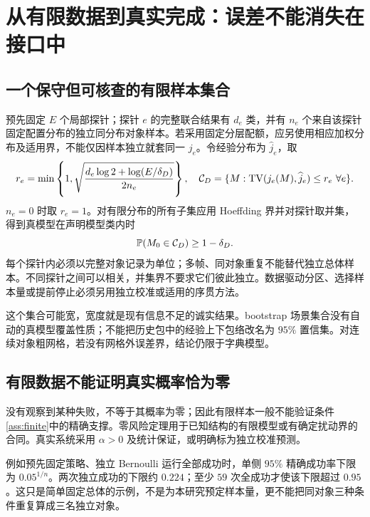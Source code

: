 \documentclass[11pt,a4paper,fontset=fandol]{ctexart}
\theoremstyle{definition}
\theoremstyle{remark}\newtheorem{remark}[theorem]{说明}
\numberwithin{equation}{section}
\newcommand{\TV}{\operatorname{TV}}\newcommand{\supp}{\operatorname{supp}}
\begin{document}
\section{从有限数据到真实完成：误差不能消失在接口中}
\label{sec:errors}
\subsection{一个保守但可核查的有限样本集合}
预先固定 $E$ 个局部探针；探针 $e$ 的完整联合结果有 $d_e$ 类，并有 $n_e$ 个来自该探针固定配置分布的独立同分布对象样本。若采用固定分层配额，应另使用相应加权分布及适用界，不能仅因样本独立就套同一 $j_e$。令经验分布为 $\widehat j_e$，取
\begin{equation}
 r_e=\min\left\{1,\sqrt{\frac{d_e\log2+\log(E/\delta_D)}{2n_e}}\right\},
 \quad
 \cC_D=\{M:\TV(j_e(M),\widehat j_e)\le r_e\ \forall e\}.
 \label{eq:conf}
\end{equation}
$n_e=0$ 时取 $r_e=1$。对有限分布的所有子集应用 Hoeffding 界并对探针取并集，得到真模型在声明模型类内时
\begin{equation}
 \mathbb P(M_0\in\mathcal C_D)\ge1-\delta_D.
\end{equation}
每个探针内必须以完整对象记录为单位；多帧、同对象重复不能替代独立总体样本。不同探针之间可以相关，并集界不要求它们彼此独立。数据驱动分区、选择样本量或提前停止必须另用独立校准或适用的序贯方法。

这个集合可能宽，宽度就是现有信息不足的诚实结果。bootstrap 场景集合没有自动的真模型覆盖性质；不能把历史包中的经验上下包络改名为 $95\%$ 置信集。对连续对象粗网格，若没有网格外误差界，结论仍限于字典模型。

\subsection{有限数据不能证明真实概率恰为零}
没有观察到某种失败，不等于其概率为零；因此有限样本一般不能验证条件\ref{ass:finite}中的精确支撑。零风险定理用于已知结构的有限模型或有确定扰动界的合同。真实系统采用 $\alpha>0$ 及统计保证，或明确标为独立校准预测。

例如预先固定策略、独立 Bernoulli 运行全部成功时，单侧 $95\%$ 精确成功率下限为 $0.05^{1/n}$。两次独立成功的下限约 $0.224$；至少 $59$ 次全成功才使该下限超过 $0.95$。这只是简单固定总体的示例，不是为本研究预定样本量，更不能把同对象三种条件重复算成三名独立对象。
\end{document}
